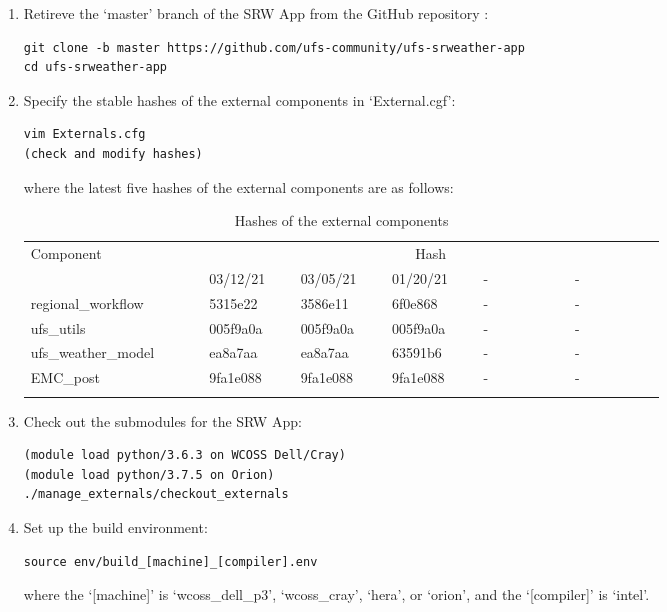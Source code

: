 \documentclass[11pt,fleqn]{report}              %
\begin{document}
\begin{enumerate}
\item Retireve the `master' branch of the SRW App from the GitHub repository :
\lstset{language=bash}   
\begin{lstlisting}[frame=trBL]
git clone -b master https://github.com/ufs-community/ufs-srweather-app
cd ufs-srweather-app
\end{lstlisting}

\item Specify the stable hashes of the external components in `External.cgf':
\lstset{language=bash}   
\begin{lstlisting}[frame=trBL]
vim Externals.cfg
(check and modify hashes)
\end{lstlisting}
 where the latest five hashes of the external components are as follows:
 {
\fontsize{10}{12}\selectfont
\begin{longtable}{p{0.21\linewidth} | p{0.11\linewidth} | p{0.11\linewidth} | p{0.11\linewidth} | p{0.11\linewidth} | p{0.11\linewidth} }
\hline
\hline
 \multirow{2}{*}{Component} & \multicolumn{5}{c}{Hash} \\
\cline{2-6}
  & 03/12/21 & 03/05/21 & 01/20/21 & - & - \\
\hline
 regional\_workflow & 5315e22 & 3586e11 & 6f0e868 & - & - \\
 ufs\_utils & 005f9a0a & 005f9a0a & 005f9a0a & - & - \\
 ufs\_weather\_model & ea8a7aa & ea8a7aa & 63591b6 & - & - \\
 EMC\_post & 9fa1e088 & 9fa1e088 & 9fa1e088 & - & - \\
\hline
\caption{Hashes of the external components}
\label{table:stable_hash_ext}
\end{longtable}
}
 
\item Check out the submodules for the SRW App:
\lstset{language=bash}   
\begin{lstlisting}[frame=trBL]
(module load python/3.6.3 on WCOSS Dell/Cray)
(module load python/3.7.5 on Orion)
./manage_externals/checkout_externals
\end{lstlisting}

\item Set up the build environment:
\lstset{language=bash}   
\begin{lstlisting}[frame=trBL]
source env/build_[machine]_[compiler].env
\end{lstlisting}
where the `[machine]' is `wcoss\_dell\_p3', `wcoss\_cray', `hera', or `orion', and the `[compiler]' is `intel'.


\end{enumerate}
\end{document}
